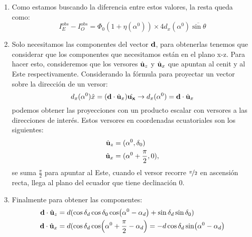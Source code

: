 \begin{enumerate}
    \item Como estamos buscando la diferencia entre estos valores, la resta queda como:
    \begin{equation*}
        I^{obs}_E -  I^{obs}_O = \Phi_0 (1+ \eta(\alpha^0)) \times 4  d_x(\alpha^0)\overline{\sin\theta}
    \end{equation*}
    
    \item Solo necesitamos las componentes del vector $\bf{d}$, para obtenerlas tenemos que considerar que los componentes que necesitamos están en el plano x-z. Para hacer esto, consideremos que los versores $\hat{\bf{u}}_z$ y $\hat{\bf{u}}_x$ que apuntan al cenit y al Este respectivamente. Considerando la fórmula para proyectar un vector sobre la dirección de un versor:
    \begin{equation}
        d_x(\alpha^0) \hat{x} =  (\textbf{d}\cdot\hat{\bf{u}}_x)\hat{\bf{u_x}} \rightarrow d_x(\alpha^0) = \textbf{d}\cdot\hat{\bf{u}}_x
    \end{equation}
    podemos obtener las proyecciones con un producto escalar con versores a las direcciones de interés. Estos versores en coordenadas ecuatoriales son los siguientes:
    \begin{align*}
        \hat{\bf{u}}_z &= (\alpha^0,\delta_0 )\\
        \hat{\bf{u}}_x &= (\alpha^0 + \frac{\pi}{2},0), 
    \end{align*}
    se suma  $\frac{\pi}{2}$ para apuntar al Este, cuando el versor recorre $\nicefrac{\pi}{2}$ en ascensión recta, llega al plano del ecuador que tiene declinación $0$.
    \item Finalmente para obtener las componentes:
    \begin{align*}
        \textbf{d}\cdot\hat{\bf{u}}_z &= d (\cos\delta_d \cos\delta_0 \cos(\alpha^0 - \alpha_d) + \sin\delta_d  \sin\delta_0)\\
        \textbf{d}\cdot\hat{\bf{u}}_x &= d (\cos\delta_d \cos(\alpha^0 +\frac{\pi}{2} - \alpha_d) 
        = -d\cos\delta_d \sin(\alpha^0  - \alpha_d)
    \end{align*}
    

\end{enumerate}
